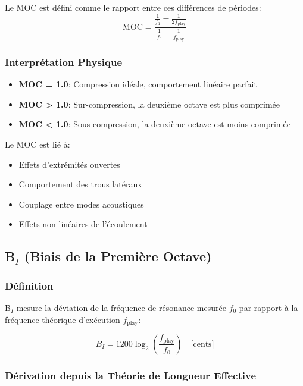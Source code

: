 \documentclass[12pt,a4paper,twocolumn]{article}
\newcommand{\freqzero}{f_0}
\newcommand{\freqone}{f_1}
\newcommand{\freqplay}{f_{\text{play}}}
\begin{document}
Le MOC est défini comme le rapport entre ces différences de périodes:
\begin{equation}
\text{MOC} = \frac{\frac{1}{\freqone} - \frac{1}{2\freqplay}}{\frac{1}{\freqzero} - \frac{1}{\freqplay}}
\label{eq:moc_def}
\end{equation}

\subsubsection{Interprétation Physique}

\begin{itemize}
    \item \textbf{MOC = 1.0}: Compression idéale, comportement linéaire parfait
    \item \textbf{MOC > 1.0}: Sur-compression, la deuxième octave est plus comprimée
    \item \textbf{MOC < 1.0}: Sous-compression, la deuxième octave est moins comprimée
\end{itemize}

Le MOC est lié à:
\begin{itemize}
    \item Effets d'extrémités ouvertes
    \item Comportement des trous latéraux
    \item Couplage entre modes acoustiques
    \item Effets non linéaires de l'écoulement
\end{itemize}

\subsection{B$_I$ (Biais de la Première Octave)}

\subsubsection{Définition}

B$_I$ mesure la déviation de la fréquence de résonance mesurée $\freqzero$ par rapport à la fréquence théorique d'exécution $\freqplay$:

\begin{equation}
B_I = 1200 \log_2\left(\frac{\freqplay}{\freqzero}\right) \quad \text{[cents]}
\label{eq:bi_def}
\end{equation}

\subsubsection{Dérivation depuis la Théorie de Longueur Effective}
\end{document}
